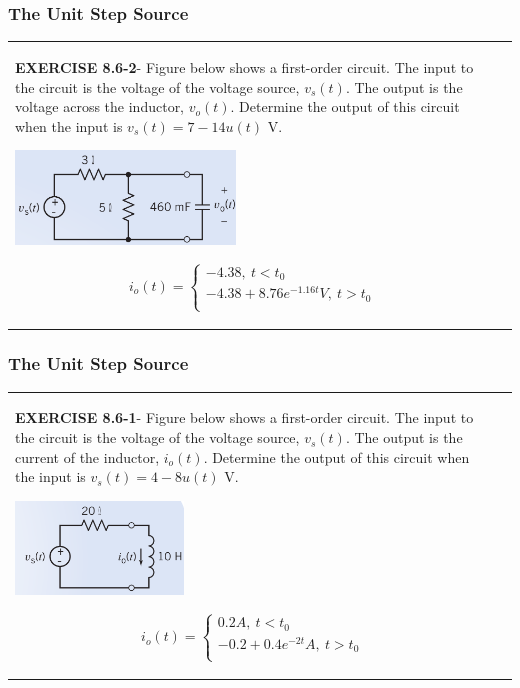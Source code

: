 \documentclass[aspectratio=169]{beamer}
\begin{document}
\begin{frame}[fragile]
	\frametitle{The Unit Step Source}
\begin{tabular}{ll}
	\begin{columns}
		\begin{column}{1\textwidth}  %
\footnotesize		\textbf{EXERCISE 8.6-2}- Figure below shows a first-order circuit. The input to the circuit is the voltage of
the voltage source, $v_s(t)$. The output is the voltage across the inductor, $v_o(t)$. Determine
the output of this circuit when the input is $v_s(t)=7-14u(t)$ V.
		\begin{center}
    			\includegraphics[height=2.5cm]{figure21.png}	
		\end{center}	
	\footnotesize	\scalebox{0.8}{Answer:} $$
	    i_o(t)=
	    \begin{cases}
	    -4.38, \ t<t_0 \\
	    -4.38+8.76e^{-1.16t}V, \ t>t_0\\
	    \end{cases}
	    $$
		\end{column}
	\end{columns}
\end{tabular}
\end{frame}
\begin{frame}[fragile]
	\frametitle{The Unit Step Source}
\begin{tabular}{ll}
	\begin{columns}
		\begin{column}{1\textwidth}  %
\footnotesize		\textbf{EXERCISE 8.6-1}- Figure below shows a first-order circuit. The input to the circuit is the voltage of
the voltage source, $v_s(t)$. The output is the current of the inductor, $i_o(t)$. Determine
the output of this circuit when the input is $v_s(t)=4-8u(t)$ V.
		\begin{center}
    			\includegraphics[height=2.5cm]{figure20.png}	
		\end{center}	
	\footnotesize	\scalebox{0.8}{Answer:} $$
	    i_o(t)=
	    \begin{cases}
	    0.2A, \ t<t_0 \\
	    -0.2+0.4e^{-2t}A, \ t>t_0\\
	    \end{cases}
	    $$
		\end{column}
	\end{columns}
\end{tabular}
\end{frame}
\end{document}
